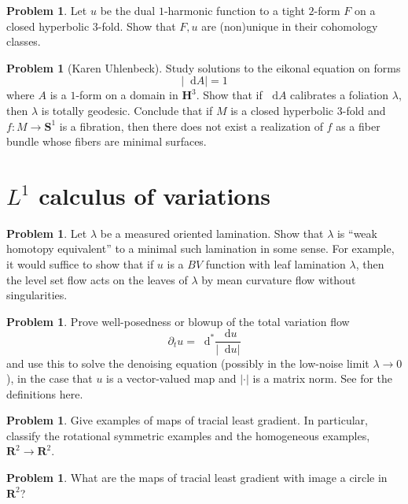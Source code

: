 \documentclass[reqno,11pt]{amsart}
\newcommand{\RR}{\mathbf{R}}
\newcommand{\Hyp}{\mathbf H}
\newcommand{\Sph}{\mathbf S}
\newcommand*\dif{\mathop{}\!\mathrm{d}}
\theoremstyle{definition}
\newtheorem{problem}[theorem]{Problem}
\numberwithin{equation}{section}
\begin{document}
\begin{problem}
Let $u$ be the dual $1$-harmonic function to a tight $2$-form $F$ on a closed hyperbolic $3$-fold.
Show that $F, u$ are (non)unique in their cohomology classes.
\end{problem}

\begin{problem}[Karen Uhlenbeck]
Study solutions to the eikonal equation on forms 
$$|\dif A| = 1$$
where $A$ is a $1$-form on a domain in $\Hyp^3$.
Show that if $\dif A$ calibrates a foliation $\lambda$, then $\lambda$ is totally geodesic.
Conclude that if $M$ is a closed hyperbolic $3$-fold and $f: M \to \Sph^1$ is a fibration, then there does not exist a realization of $f$ as a fiber bundle whose fibers are minimal surfaces.
\end{problem}

\section{\texorpdfstring{$L^1$}{L-1} calculus of variations}
\begin{problem}
Let $\lambda$ be a measured oriented lamination.
Show that $\lambda$ is ``weak homotopy equivalent'' to a minimal such lamination in some sense.
For example, it would suffice to show that if $u$ is a $BV$ function with leaf lamination $\lambda$, then the level set flow acts on the leaves of $\lambda$ by mean curvature flow without singularities.
\end{problem}

\begin{problem}
Prove well-posedness or blowup of the total variation flow 
$$\partial_t u = \dif^* \frac{\dif u}{|\dif u|}$$
and use this to solve the denoising equation (possibly in the low-noise limit $\lambda \to 0$), in the case that $u$ is a vector-valued map and $|\cdot|$ is a matrix norm.
See \cite{Novaga04} for the definitions here.
\end{problem}

\begin{problem}
Give examples of maps of tracial least gradient.
In particular, classify the rotational symmetric examples and the homogeneous examples, $\RR^2 \to \RR^2$.
\end{problem}

\begin{problem}
What are the maps of tracial least gradient with image a circle in $\RR^2$?
\end{problem}
\end{document}

